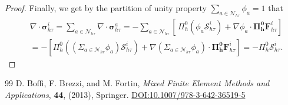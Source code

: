\documentclass[10pt,a4paper]{amsart}
\def \Fhti {\bm{F}_\htt^i}
\def \Shti {\calS_\htt^i}
\def \calN {\mathcal{N}}
\def \calS {\mathcal{S}}
\def \flx {\bm{\sigma}_{\htt}^i}
\def \flxa {\bm{\sigma}^a_{\htt}}
\def \htt {{h\tau}}
\def \t  {\tau}
\begin{document}
\begin{proof}
Finally, we get by the partition of unity property $\sum_{a\in \calN_{h\t}} \phi_a=1$ that
\begin{align*}
    &\nabla \cdot \flx = \sum_{a\in \calN_{h\t}} \nabla \cdot \flxa= -\sum_{a\in \calN_{h\t}} \left[\,\Pi_h^0 (\phi_a \Shti) + \nabla\phi_a \cdot \bm{\Pi_h^0} \Fhti\right]\\
    &= - \left[\Pi_h^0 \left((\Sigma_{a\in \calN_{h\t}} \phi_a) \Shti\right) + \nabla(\Sigma_{a\in \calN_\htt}\phi_a ) \cdot \bm{\Pi_h^0} \Fhti\right]= - \Pi_h^0 \Shti.
\end{align*}
\end{proof}

\begin{thebibliography}{99}
 D. Boffi, F. Brezzi, and M. Fortin, \emph{{Mixed Finite Element Methods} and {Applications}}, \textbf{44}, (2013), Springer. \href{https://doi.org/10.1007/978-3-642-36519-5}{DOI:10.1007/978-3-642-36519-5}
\end{thebibliography}
\end{document}
